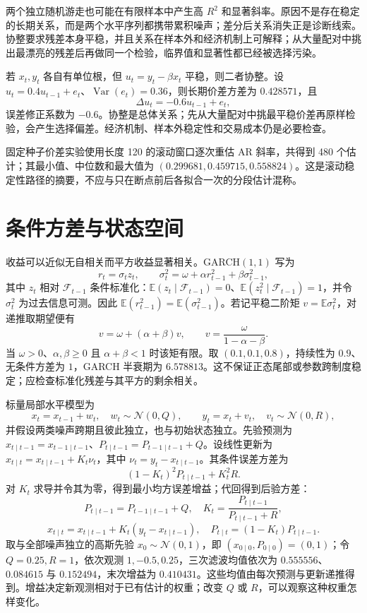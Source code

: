 两个独立随机游走也可能在有限样本中产生高 $R^2$ 和显著斜率。原因不是存在稳定的长期关系，而是两个水平序列都携带累积噪声；差分后关系消失正是诊断线索。协整要求残差本身平稳，并且关系在样本外和经济机制上可解释；从大量配对中挑出最漂亮的残差后再做同一个检验，临界值和显著性都已经被选择污染。

若 $x_t,y_t$ 各自有单位根，但 $u_t=y_t-\beta x_t$ 平稳，则二者协整。设 $u_t=0.4u_{t-1}+e_t$、$\operatorname{Var}(e_t)=0.36$，则长期价差方差为 $0.428571$，且
\[
\Delta u_t=-0.6u_{t-1}+e_t,
\]
误差修正系数为 $-0.6$。协整是总体关系；先从大量配对中挑最平稳价差再原样检验，会产生选择偏差。经济机制、样本外稳定性和交易成本仍是必要检查。

固定种子价差实验使用长度 120 的滚动窗口逐次重估 AR 斜率，共得到 480 个估计；其最小值、中位数和最大值为 $(0.299681,0.459715,0.558824)$。这是滚动稳定性路径的摘要，不应与只在断点前后各拟合一次的分段估计混称。

\section{条件方差与状态空间}

收益可以近似无自相关而平方收益显著相关。GARCH$(1,1)$ 写为
\[
r_t=\sigma_tz_t,\qquad \sigma_t^2=\omega+\alpha r_{t-1}^2+\beta\sigma_{t-1}^2,
\]
其中 $z_t$ 相对 $\mathcal F_{t-1}$ 条件标准化：$\mathbb E(z_t\mid\mathcal F_{t-1})=0$、$\mathbb E(z_t^2\mid\mathcal F_{t-1})=1$，并令 $\sigma_t^2$ 为过去信息可测。因此 $\mathbb E(r_{t-1}^2)=\mathbb E(\sigma_{t-1}^2)$。若记平稳二阶矩 $v=\mathbb E\sigma_t^2$，对递推取期望便有
\[
v=\omega+(\alpha+\beta)v,\qquad
v=\frac{\omega}{1-\alpha-\beta}.
\]
当 $\omega>0$、$\alpha,\beta\ge0$ 且 $\alpha+\beta<1$ 时该矩有限。取 $(0.1,0.1,0.8)$，持续性为 $0.9$、无条件方差为 $1$，GARCH 半衰期为 $6.578813$。这不保证正态尾部或参数跨制度稳定；应检查标准化残差与其平方的剩余相关。


标量局部水平模型为
\[
  x_t=x_{t-1}+w_t,\quad w_t\sim\mathcal N(0,Q),
  \qquad y_t=x_t+v_t,\quad v_t\sim\mathcal N(0,R),
\]
并假设两类噪声跨期且彼此独立，也与初始状态独立。先验预测为 $x_{t\mid t-1}=x_{t-1\mid t-1}$、$P_{t\mid t-1}=P_{t-1\mid t-1}+Q$。设线性更新为 $x_{t\mid t}=x_{t\mid t-1}+K_t\nu_t$，其中 $\nu_t=y_t-x_{t\mid t-1}$。其条件误差方差为
\[
(1-K_t)^2P_{t\mid t-1}+K_t^2R.
\]
对 $K_t$ 求导并令其为零，得到最小均方误差增益；代回得到后验方差：
\[
  P_{t\mid t-1}=P_{t-1\mid t-1}+Q,
  \quad K_t=\frac{P_{t\mid t-1}}{P_{t\mid t-1}+R},
\]
\[
  x_{t\mid t}=x_{t\mid t-1}+K_t(y_t-x_{t\mid t-1}),
  \quad P_{t\mid t}=(1-K_t)P_{t\mid t-1}.
\]
取与全部噪声独立的高斯先验 $x_0\sim\mathcal N(0,1)$，即 $(x_{0\mid0},P_{0\mid0})=(0,1)$；令 $Q=0.25,R=1$，依次观测 $1,-0.5,0.25$，三次滤波均值依次为 $0.555556$、$0.084615$ 与 $0.152494$，末次增益为 $0.410431$。这些均值由每次预测与更新递推得到。增益决定新观测相对于已有估计的权重；改变 $Q$ 或 $R$，可以观察这种权重怎样变化。

